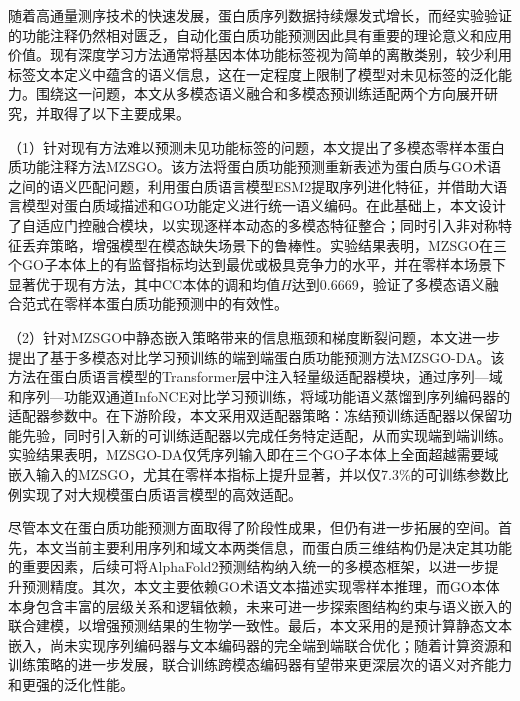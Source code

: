 
\begin{conclusions}
随着高通量测序技术的快速发展，蛋白质序列数据持续爆发式增长，而经实验验证的功能注释仍然相对匮乏，自动化蛋白质功能预测因此具有重要的理论意义和应用价值。现有深度学习方法通常将基因本体功能标签视为简单的离散类别，较少利用标签文本定义中蕴含的语义信息，这在一定程度上限制了模型对未见标签的泛化能力。围绕这一问题，本文从多模态语义融合和多模态预训练适配两个方向展开研究，并取得了以下主要成果。

（1）针对现有方法难以预测未见功能标签的问题，本文提出了多模态零样本蛋白质功能注释方法MZSGO。该方法将蛋白质功能预测重新表述为蛋白质与GO术语之间的语义匹配问题，利用蛋白质语言模型ESM2提取序列进化特征，并借助大语言模型对蛋白质域描述和GO功能定义进行统一语义编码。在此基础上，本文设计了自适应门控融合模块，以实现逐样本动态的多模态特征整合；同时引入非对称特征丢弃策略，增强模型在模态缺失场景下的鲁棒性。实验结果表明，MZSGO在三个GO子本体上的有监督指标均达到最优或极具竞争力的水平，并在零样本场景下显著优于现有方法，其中CC本体的调和均值$H$达到0.6669，验证了多模态语义融合范式在零样本蛋白质功能预测中的有效性。

（2）针对MZSGO中静态嵌入策略带来的信息瓶颈和梯度断裂问题，本文进一步提出了基于多模态对比学习预训练的端到端蛋白质功能预测方法MZSGO-DA。该方法在蛋白质语言模型的Transformer层中注入轻量级适配器模块，通过序列—域和序列—功能双通道InfoNCE对比学习预训练，将域功能语义蒸馏到序列编码器的适配器参数中。在下游阶段，本文采用双适配器策略：冻结预训练适配器以保留功能先验，同时引入新的可训练适配器以完成任务特定适配，从而实现端到端训练。实验结果表明，MZSGO-DA仅凭序列输入即在三个GO子本体上全面超越需要域嵌入输入的MZSGO，尤其在零样本指标上提升显著，并以仅7.3\%的可训练参数比例实现了对大规模蛋白质语言模型的高效适配。

尽管本文在蛋白质功能预测方面取得了阶段性成果，但仍有进一步拓展的空间。首先，本文当前主要利用序列和域文本两类信息，而蛋白质三维结构仍是决定其功能的重要因素，后续可将AlphaFold2预测结构纳入统一的多模态框架，以进一步提升预测精度。其次，本文主要依赖GO术语文本描述实现零样本推理，而GO本体本身包含丰富的层级关系和逻辑依赖，未来可进一步探索图结构约束与语义嵌入的联合建模，以增强预测结果的生物学一致性。最后，本文采用的是预计算静态文本嵌入，尚未实现序列编码器与文本编码器的完全端到端联合优化；随着计算资源和训练策略的进一步发展，联合训练跨模态编码器有望带来更深层次的语义对齐能力和更强的泛化性能。

\end{conclusions}
